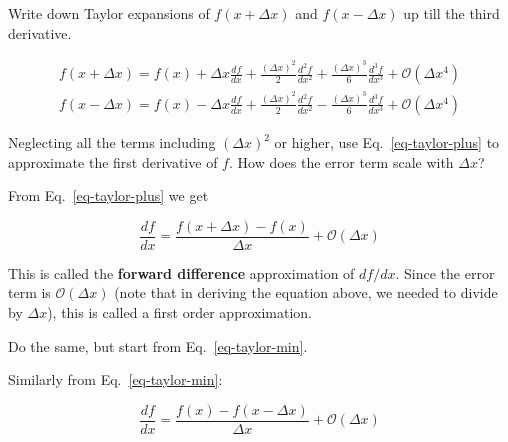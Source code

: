 \begin{cue}
\noindent{}Write down Taylor expansions of $f(x+\Delta x)$ and $f(x-\Delta x)$ up till the third derivative. 
\end{cue}

\begin{gather}
f(x+\Delta x) = f(x) + \Delta x \frac{d f}{d x} + \frac{{(\Delta x)}^2}{2} \frac{d^2 f}{d x^2} + \frac{{(\Delta x)}^3}{6} \frac{d^3 f}{d x^3} + \mathcal{O}\left(\Delta x^4\right) \label{eq-taylor-plus} \\
f(x-\Delta x) = f(x) - \Delta x \frac{d f}{d x} + \frac{{(\Delta x)}^2}{2} \frac{d^2 f}{d x^2} - \frac{{(\Delta x)}^3}{6} \frac{d^3 f}{d x^3} + \mathcal{O}\left(\Delta x^4\right) \label{eq-taylor-min}
\end{gather} 

\begin{cue}
Neglecting all the terms including $\left(\Delta x\right)^2$ or higher, use Eq.~\ref{eq-taylor-plus} to approximate the first derivative of $f$. How does the error term scale with $\Delta x$? 
\end{cue}

From Eq.~\ref{eq-taylor-plus} we get

\begin{equation}
\frac{d f}{d x} = \frac{f(x+\Delta x) - f(x)}{\Delta x} + \mathcal{O}\left(\Delta x\right)
\end{equation} 

This is called the \textbf{forward difference} approximation of $df / dx$. Since the error term is $\mathcal{O}(\Delta x)$ (note that in deriving the equation above, we needed to divide by $\Delta x$), this is called a first order approximation.

\begin{cue}
Do the same, but start from Eq.~\ref{eq-taylor-min}.
\end{cue}

Similarly from Eq.~\ref{eq-taylor-min}:

\begin{equation}
\frac{d f}{d x} = \frac{f(x) - f(x- \Delta x)}{\Delta x} + \mathcal{O}\left(\Delta x\right)
\end{equation} 

